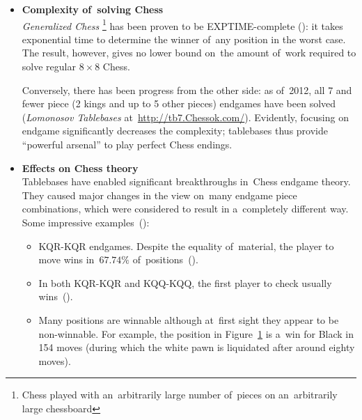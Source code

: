 \begin{itemize}
    \setlength\itemsep{-.5ex}
  \item \textbf{Complexity of~solving Chess}
    \\
    \emph{Generalized Chess}%
    \footnote{Chess played with an~arbitrarily large number of~pieces on an~arbitrarily large chessboard}
    has been proven to be EXPTIME-complete (\cite{Fraenkel1981computing}):
    it takes exponential time to determine the winner of~any position in the worst case.
    The result, however, gives no lower bound on~the amount of~work required to solve regular $8\times 8$ Chess.

    Conversely, there has been progress from the other side:
    as of~2012, all 7 and fewer piece (2 kings and up to 5 other pieces) endgames have been solved (\emph{Lomonosov Tablebases} at~\href{http://tb7.chessok.com/}{http://tb7.Chessok.com/}).
    Evidently, focusing on endgame significantly decreases the complexity; tablebases thus provide ``powerful arsenal'' to play perfect Chess endings.

  \item \textbf{Effects on Chess theory}
    \\
    Tablebases have enabled significant breakthroughs in~Chess endgame theory.
    They caused major changes in the view on~many endgame piece combinations, which were considered to result in a~completely different way.
    Some impressive examples~(\cite{Wikipedia2016endgame}):%
    \begin{itemize}
        \setlength\itemsep{-.5ex}
      \item KQR-KQR endgames.
        Despite the equality of~material, the player to move wins in~$67.74\%$ of~positions~(\cite{Haworth2001discarding}).

      \item In both KQR-KQR and KQQ-KQQ, the first player to check usually wins~(\cite[p.~379, 384]{Nunn2002secrets}).

      \item
        Many positions are winnable although at~first sight they appear to be non-winnable.
        For example, the position in Figure~\ref{fig:80-moves-to-liquidate-the-pawn} is a~win for Black in 154 moves (during which the white pawn is liquidated after around eighty moves).
        \begin{figure}
          \centering
          \newgame
          \showboard
          \label{fig:80-moves-to-liquidate-the-pawn}
        \end{figure}


\end{itemize}
\end{itemize}
